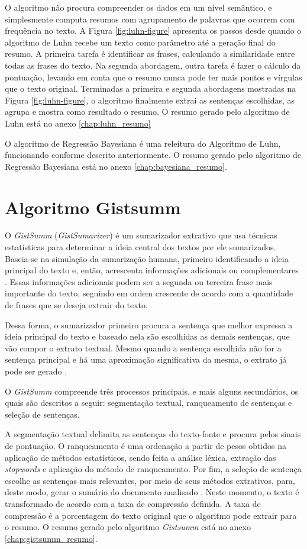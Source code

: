 O algoritmo não procura compreender os dados em um nível semântico, e simplesmente computa resumos com 
agrupamento de palavras que ocorrem com frequência no texto. A Figura \ref{fig:luhn-figure} apresenta os 
passos desde quando o algoritmo de Luhn recebe um texto como parâmetro até a geração final do resumo. A 
primeira tarefa é identificar as frases, calculando a similaridade entre todas as frases do texto. Na 
segunda abordagem, outra tarefa é fazer o cálculo da pontuação, levando em conta que o resumo nunca pode ter 
mais pontos e vírgulas que o texto original. Terminadas a primeira e segunda abordagens mostradas na Figura 
\ref{fig:luhn-figure}, o algoritmo finalmente extrai as sentenças escolhidas, as agrupa e mostra como resultado o resumo. O resumo gerado pelo algoritmo de Luhn está no anexo \ref{chap:luhn_resumo}

O algoritmo de Regressão Bayesiana é uma releitura do Algoritmo de Luhn, funcionando conforme descrito anteriormente. O resumo gerado pelo algoritmo de Regressão Bayesiana está no anexo \ref{chap:bayesiana_resumo}.


\section{Algoritmo Gistsumm}
\label{chap:Alggistsumm}
O \textit{GistSumm} (\textit{GistSumarizer}) é um sumarizador extrativo que usa técnicas estatísticas para determinar a ideia central dos textos por ele sumarizados. Baseia-se na simulação da sumarização humana, primeiro identificando a ideia principal do texto e, então, acrescenta informações adicionais ou complementares \cite{brewka1996artificial}. Essas informações adicionais podem ser a segunda ou terceira frase mais importante do texto, seguindo em ordem crescente de acordo com a quantidade de frases que se deseja extrair do texto.

Dessa forma, o sumarizador primeiro procura a sentença que melhor expressa a ideia principal do texto e baseado nela são escolhidas as demais sentenças, que vão compor o extrato textual. Mesmo quando a sentença escolhida não for a sentença principal e há uma aproximação significativa da mesma, o extrato já pode ser gerado \cite{torres2014automatic}. 

O \textit{GistSumm} compreende três processos principais, e mais alguns secundários, os quais são descritos a seguir: segmentação textual, ranqueamento de sentenças e seleção de sentenças.

A segmentação textual delimita as sentenças do texto-fonte e procura pelos sinais de pontuação. O ranqueamento é uma ordenação a partir de pesos obtidos na aplicação de métodos estatísticos, sendo feita a análise léxica, extração das \textit{stopwords} e aplicação do método de ranqueamento. Por fim, a seleção de sentença escolhe as sentenças mais relevantes, por meio de seus métodos extrativos, para, deste modo, gerar o sumário do documento analisado \cite{muller2015comparativo}. Neste momento, o texto é transformado de acordo com a taxa de compressão definida. A taxa de compressão é a porcentagem do texto original que o algoritmo pode extrair para o resumo.
O resumo gerado pelo algoritmo \textit{Gistsumm} está no anexo \ref{chap:gistsumm_resumo}.



